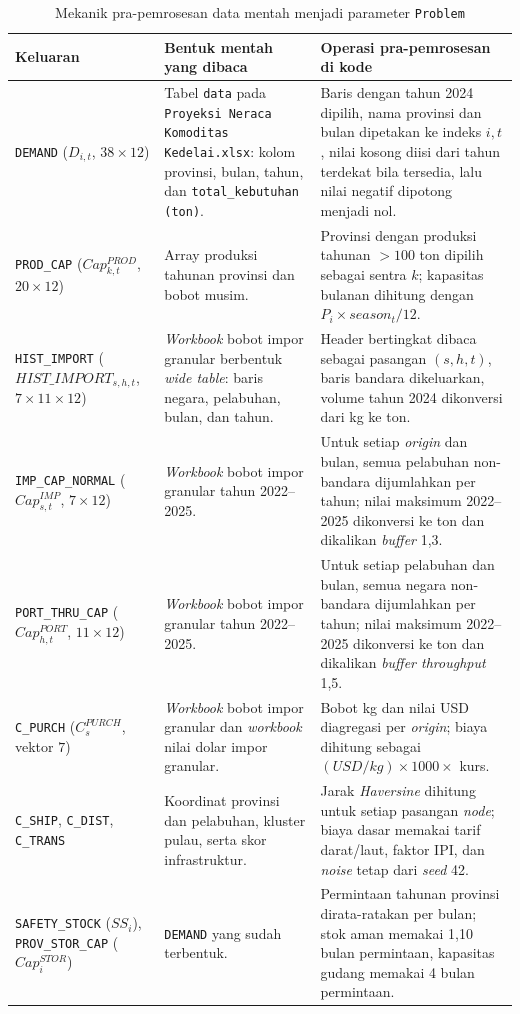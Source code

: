 \documentclass{file/TA-ITS}
\theoremstyle{definition}
\theoremstyle{definition}
\theoremstyle{plain}
\begin{document}
\begin{table}[H]
\centering
\caption{Mekanik pra-pemrosesan data mentah menjadi parameter \texttt{Problem}}
\label{tab:preprocess_mechanics}
\scriptsize
\renewcommand{\arraystretch}{2}
\begin{tabularx}{\textwidth}{@{}p{}p{}X@{}}
\toprule
\textbf{Keluaran} & \textbf{Bentuk mentah yang dibaca} & \textbf{Operasi pra-pemrosesan di kode} \\
\midrule
\texttt{DEMAND} ($D_{i,t}$, $38 \times 12$) & Tabel \texttt{data} pada \texttt{Proyeksi Neraca Komoditas Kedelai.xlsx}: kolom provinsi, bulan, tahun, dan \texttt{total\_kebutuhan (ton)}. & Baris dengan tahun 2024 dipilih, nama provinsi dan bulan dipetakan ke indeks $i,t$, nilai kosong diisi dari tahun terdekat bila tersedia, lalu nilai negatif dipotong menjadi nol. \\
\texttt{PROD\_CAP} ($Cap^{PROD}_{k,t}$, $20 \times 12$) & Array produksi tahunan provinsi dan bobot musim. & Provinsi dengan produksi tahunan $>100$ ton dipilih sebagai sentra $k$; kapasitas bulanan dihitung dengan $P_i \times season_t/12$. \\
\texttt{HIST\_IMPORT} ($HIST\_IMPORT_{s,h,t}$, $7 \times 11 \times 12$) & \textit{Workbook} bobot impor granular berbentuk \textit{wide table}: baris negara, pelabuhan, bulan, dan tahun. & Header bertingkat dibaca sebagai pasangan $(s,h,t)$, baris bandara dikeluarkan, volume tahun 2024 dikonversi dari kg ke ton. \\
\texttt{IMP\_CAP\_NORMAL} ($Cap^{IMP}_{s,t}$, $7 \times 12$) & \textit{Workbook} bobot impor granular tahun 2022--2025. & Untuk setiap \textit{origin} dan bulan, semua pelabuhan non-bandara dijumlahkan per tahun; nilai maksimum 2022--2025 dikonversi ke ton dan dikalikan \textit{buffer} 1,3. \\
\texttt{PORT\_THRU\_CAP} ($Cap^{PORT}_{h,t}$, $11 \times 12$) & \textit{Workbook} bobot impor granular tahun 2022--2025. & Untuk setiap pelabuhan dan bulan, semua negara non-bandara dijumlahkan per tahun; nilai maksimum 2022--2025 dikonversi ke ton dan dikalikan \textit{buffer throughput} 1,5. \\
\texttt{C\_PURCH} ($C^{PURCH}_{s}$, vektor $7$) & \textit{Workbook} bobot impor granular dan \textit{workbook} nilai dolar impor granular. & Bobot kg dan nilai USD diagregasi per \textit{origin}; biaya dihitung sebagai $(USD/kg)\times 1000 \times$ kurs. \\
\texttt{C\_SHIP}, \texttt{C\_DIST}, \texttt{C\_TRANS} & Koordinat provinsi dan pelabuhan, kluster pulau, serta skor infrastruktur. & Jarak \textit{Haversine} dihitung untuk setiap pasangan \textit{node}; biaya dasar memakai tarif darat/laut, faktor IPI, dan \textit{noise} tetap dari \textit{seed} 42. \\
\texttt{SAFETY\_STOCK} ($SS_i$), \texttt{PROV\_STOR\_CAP} ($Cap^{STOR}_i$) & \texttt{DEMAND} yang sudah terbentuk. & Permintaan tahunan provinsi dirata-ratakan per bulan; stok aman memakai 1,10 bulan permintaan, kapasitas gudang memakai 4 bulan permintaan. \\
\bottomrule
\end{tabularx}
\renewcommand{\arraystretch}{1}
\end{table}
\end{document}
